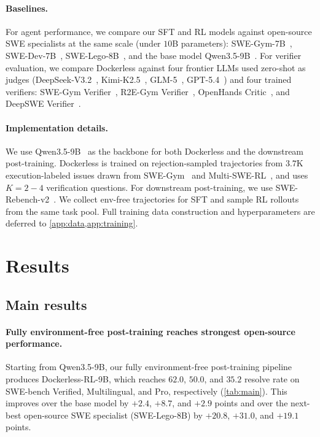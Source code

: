 \documentclass{llmxive}
\providecommand{\approach}{Dockerless\xspace}
\begin{document}
\paragraph{Baselines.}
For agent performance, we compare our SFT and RL models against open-source SWE specialists at the same scale (under $10$B parameters): SWE-Gym-7B~\citep{pan2025training}, SWE-Dev-7B~\citep{wang2025swedev}, SWE-Lego-8B~\citep{tao2026swelego}, and the base model Qwen3.5-9B~\citep{team2026qwen35}.
For verifier evaluation, we compare \approach against four frontier LLMs used zero-shot as judges (DeepSeek-V3.2~\citep{liu2025deepseek}, Kimi-K2.5~\citep{team2026kimi}, GLM-5~\citep{zeng2026glm}, GPT-5.4~\citep{openai2026gpt54}) and four trained verifiers: SWE-Gym Verifier~\citep{pan2025training}, R2E-Gym Verifier~\citep{jain2025r2e}, OpenHands Critic~\citep{wang2026rubric}, and DeepSWE Verifier~\citep{luo2025deepswe}.

\paragraph{Implementation details.}
We use Qwen3.5-9B~\citep{team2026qwen35} as the backbone for both \approach and the downstream post-training.
\approach is trained on rejection-sampled trajectories from $3.7$K execution-labeled issues drawn from SWE-Gym~\citep{pan2025training} and Multi-SWE-RL~\citep{zan2026multi}, and uses $K{=}2-4$ verification questions.
For downstream post-training, we use SWE-Rebench-v2~\citep{badertdinov2026swev2}. We collect env-free trajectories for SFT and sample RL rollouts from the same task pool.
Full training data construction and hyperparameters are deferred to \cref{app:data,app:training}.

\section{Results}

\subsection{Main results}
\label{sec:main-results}

\paragraph{Fully environment-free post-training reaches strongest open-source performance.}
Starting from Qwen3.5-9B, our fully environment-free post-training pipeline produces \approach-RL-9B, which reaches $62.0$, $50.0$, and $35.2$ resolve rate on SWE-bench Verified, Multilingual, and Pro, respectively (\cref{tab:main}).
This improves over the base model by $+2.4$, $+8.7$, and $+2.9$ points and over the next-best open-source SWE specialist (SWE-Lego-8B) by $+20.8$, $+31.0$, and $+19.1$ points.
\end{document}
